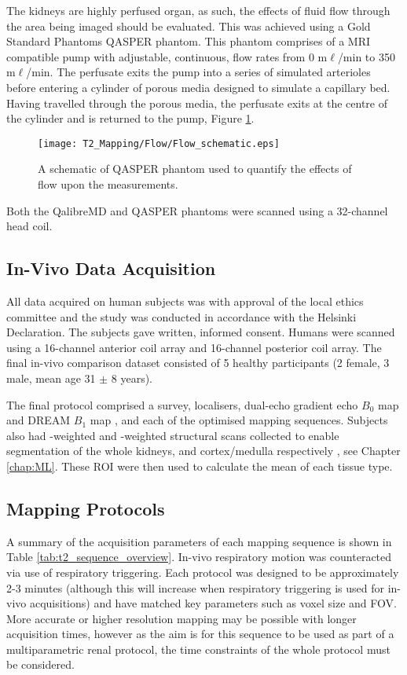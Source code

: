 The kidneys are highly perfused organ, as such, the effects of fluid flow through the area being imaged should be evaluated. This was achieved using a Gold Standard Phantoms \ac{QASPER} phantom. This phantom comprises of a \ac{MRI} compatible pump with adjustable, continuous, flow rates from 0 m$\ell$/min to 350 m$\ell$/min. The perfusate exits the pump into a series of simulated arterioles before entering a cylinder of porous media designed to simulate a capillary bed. Having travelled through the porous media, the perfusate exits at the centre of the cylinder and is returned to the pump, Figure \ref{fig:t2_flow_phantom_schematic}. 

\begin{figure}[H]
	\centering
	\texttt{[image: T2\_Mapping/Flow/Flow\_schematic.eps]}
	\caption{A schematic of \ac{QASPER} phantom used to quantify the effects of flow upon the \ttwo measurements.}
	\label{fig:t2_flow_phantom_schematic}	
\end{figure}

Both the QalibreMD and \ac{QASPER} phantoms were scanned using a 32-channel head coil. 

\subsection{In-Vivo Data Acquisition}
All data acquired on human subjects was with approval of the local ethics committee and the study was conducted in accordance with the Helsinki Declaration. The subjects gave written, informed consent. Humans were scanned using a 16-channel anterior coil array and 16-channel posterior coil array. The final in-vivo comparison dataset consisted of 5 healthy participants (2 female, 3 male, mean age 31 $\pm$ 8 years).

The final protocol comprised a survey, localisers, dual-echo gradient echo $B_0$ map and \ac{DREAM} $B_1$ map \cite{nehrke_dreamnovel_2012}, and each of the optimised \ttwo mapping sequences. Subjects also had \ttwo-weighted and \tone-weighted structural scans collected to enable segmentation of the whole kidneys, and cortex/medulla respectively \cite{petzold_building_2014, will_automated_2014}, see Chapter \ref{chap:ML}. These \ac{ROI} were then used to calculate the mean \ttwo of each tissue type. 

\subsection{\ttwo Mapping Protocols}
\label{subsec:t2_acq_schemes}
A summary of the acquisition parameters of each \ttwo mapping sequence is shown in Table \ref{tab:t2_sequence_overview}. In-vivo respiratory motion was counteracted via use of respiratory triggering. Each protocol was designed to be  approximately 2-3 minutes (although this will increase when respiratory triggering is used for in-vivo acquisitions) and have matched key parameters such as voxel size and \ac{FOV}. More accurate or higher resolution \ttwo mapping may be possible with longer acquisition times, however as the aim is for this sequence to be used as part of a multiparametric renal protocol, the time constraints of the whole protocol must be considered. 

